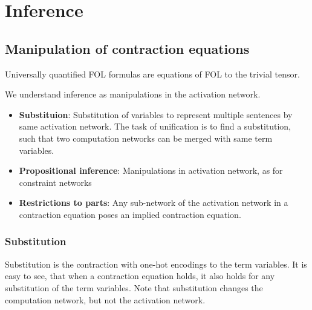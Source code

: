 \section{Inference}




\subsection{Manipulation of contraction equations}

Universally quantified FOL formulas are equations of FOL \ComputationActivationNetworks{} to the trivial tensor.


We understand inference as manipulations in the activation network.
\begin{itemize}
    \item {\bf Substituion}: Substitution of variables to represent multiple sentences by same activation network.
    The task of unification is to find a substitution, such that two computation networks can be merged with same term variables.
    \item {\bf Propositional inference}: Manipulations in activation network, as for constraint networks
    \item {\bf Restrictions to parts}: Any sub-network of the activation network in a contraction equation poses an implied contraction equation.
\end{itemize}

\subsubsection{Substitution}

Substitution is the contraction with one-hot encodings to the term variables.
It is easy to see, that when a contraction equation holds, it also holds for any substitution of the term variables.
Note that substitution changes the computation network, but not the activation network.

